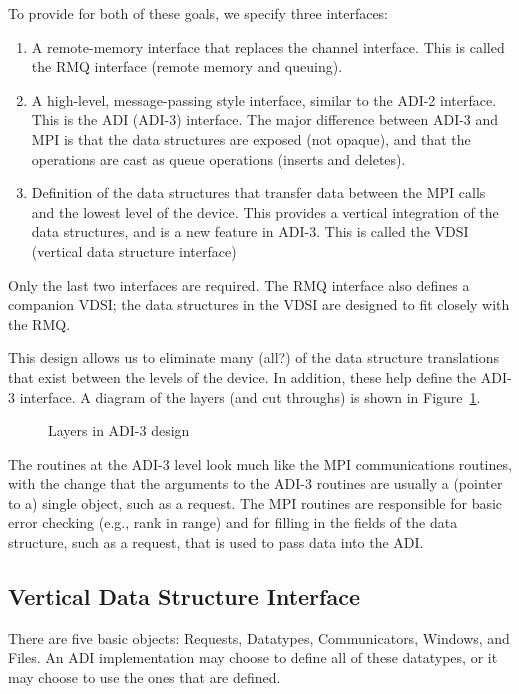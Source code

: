 \documentclass{article}
\begin{document}
To provide for both of these goals, we specify three interfaces:
\begin{enumerate}
\item A remote-memory interface that replaces the channel interface. This is
  called the RMQ interface (remote memory and queuing).
\item A high-level, message-passing style interface, similar to the ADI-2
  interface.  This is the ADI (ADI-3) interface.  The major difference between
  ADI-3 and MPI is that the data structures are exposed (not opaque), and that
  the operations are cast as queue operations (inserts and deletes).
\item Definition of the data structures that transfer data between the MPI
  calls and the lowest level of the device.  This provides a vertical
  integration of the data structures, and is a new feature in ADI-3.  This is
  called the VDSI (vertical data structure interface)
\end{enumerate}
Only the last two interfaces are required.  The RMQ interface also defines a
companion VDSI; the data structures in the VDSI are designed to fit closely
with the RMQ.

This design allows us to eliminate many (all?) of the data structure
translations 
that exist between the levels of the device.  In addition, these help define
the ADI-3 interface.  A diagram of the layers (and cut throughs) is shown in
Figure~\ref{fig:layers}.

\begin{figure}
\centerline{}
\caption{Layers in ADI-3 design}
\label{fig:layers}
\end{figure}

The routines at the ADI-3 level look much like the MPI communications
routines, with the change that the arguments to the ADI-3 routines are usually
a (pointer to a) single object, such as a request.  The MPI routines are
responsible for basic error checking (e.g., rank in range) and for filling in
the fields of the data structure, such as a request, that is used to pass data
into the ADI.  

\subsection{Vertical Data Structure Interface}
There are five basic objects: Requests, Datatypes, Communicators, Windows, and
Files.  An ADI implementation may choose to define all of these datatypes, or
it may choose to use the ones that are defined.  
\end{document}
